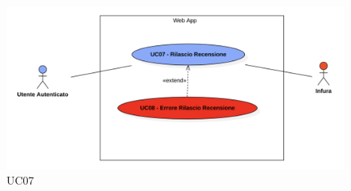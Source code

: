             \begin{figure}[H]
                \centering
                \includegraphics[scale=0.6]{src/img/UC07.png}
                \caption{UC07}
            \end{figure}

